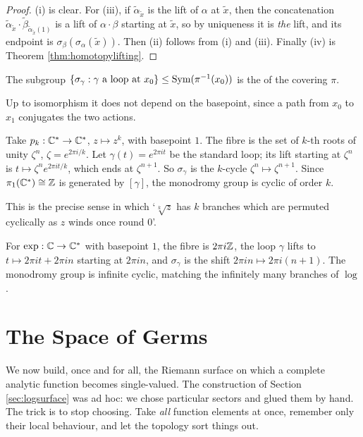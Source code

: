 \documentclass[a4paper]{scrartcl}
\newcommand{\Cs}{\C^*}
\begin{document}
\begin{proof}
	(i) is clear. For (iii), if $\tilde\alpha_{\tilde x}$ is the lift of $\alpha$ at
	$\tilde x$, then the concatenation $\tilde\alpha_{\tilde x} \cdot
	\tilde\beta_{\tilde\alpha_{\tilde x}(1)}$ is a lift of $\alpha\cdot\beta$ starting at
	$\tilde x$, so by uniqueness it is \emph{the} lift, and its endpoint is
	$\sigma_\beta(\sigma_\alpha(\tilde x))$. Then (ii) follows from (i) and (iii). Finally
	(iv) is Theorem \ref{thm:homotopylifting}.
\end{proof}

\begin{definition}
	The subgroup $\{\sigma_\gamma : \gamma \text{ a loop at } x_0\} \leq \operatorname{Sym}(\pi^{-1}(x_0))$
	is the  of the covering $\pi$.
\end{definition}

Up to isomorphism it does not depend on the basepoint, since a path from $x_0$ to $x_1$
conjugates the two actions.

\begin{example}\label{ex:monodromypk}
	Take $p_k : \Cs \to \Cs$, $z \mapsto z^k$, with basepoint $1$. The fibre is the set of
	$k$-th roots of unity $\zeta^n$, $\zeta = e^{2\pi i /k}$. Let $\gamma(t) = e^{2\pi i t}$
	be the standard loop; its lift starting at $\zeta^n$ is
	$t \mapsto \zeta^n e^{2\pi i t /k}$, which ends at $\zeta^{n+1}$. So $\sigma_\gamma$ is
	the $k$-cycle $\zeta^n \mapsto \zeta^{n+1}$. Since $\pi_1(\Cs) \cong \Z$ is generated by
	$[\gamma]$, the monodromy group is cyclic of order $k$.

	This is the precise sense in which `$\sqrt[k]{z}$ has $k$ branches which are permuted
	cyclically as $z$ winds once round $0$'.
\end{example}

\begin{example}
	For $\exp : \C \to \Cs$ with basepoint $1$, the fibre is $2\pi i \mathbb{Z}$, the loop $\gamma$
	lifts to $t \mapsto 2\pi i t + 2\pi i n$ starting at $2\pi i n$, and
	$\sigma_\gamma$ is the shift $2\pi i n \mapsto 2\pi i (n+1)$. The monodromy group is
	infinite cyclic, matching the infinitely many branches of $\log$.
\end{example}

\section{The Space of Germs}\label{sec:germs}

We now build, once and for all, the Riemann surface on which a complete analytic function
becomes single-valued. The construction of Section \ref{sec:logsurface} was ad hoc: we
chose particular sectors and glued them by hand. The trick is to stop choosing. Take
\emph{all} function elements at once, remember only their local behaviour, and let the
topology sort things out.
\end{document}
